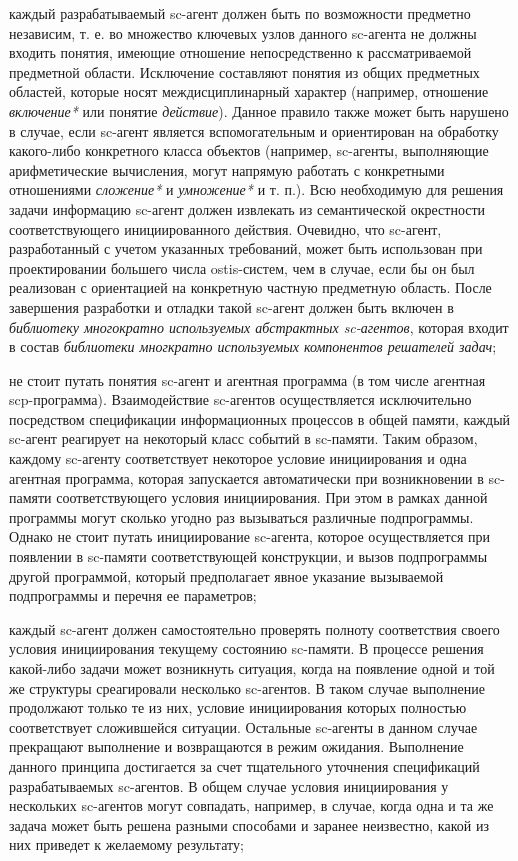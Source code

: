 \begin{textitemize}
\item каждый разрабатываемый sc-агент должен быть по возможности предметно независим, т. е. во множество ключевых узлов данного sc-агента не должны входить понятия, имеющие отношение непосредственно к рассматриваемой предметной области. Исключение составляют понятия из общих предметных областей, которые носят междисциплинарный характер (например, отношение \textit{включение*} или понятие \textit{действие}). Данное правило также может быть нарушено в случае, если sc-агент является вспомогательным и ориентирован на обработку какого-либо конкретного класса объектов (например, sc-агенты, выполняющие арифметические вычисления, могут напрямую работать с конкретными отношениями \textit{сложение*} и \textit{умножение*} и т. п.). Всю необходимую для решения задачи информацию sc-агент должен извлекать из семантической окрестности соответствующего инициированного действия. Очевидно, что sc-агент, разработанный с учетом указанных требований, может быть использован при проектировании большего числа ostis-систем, чем в случае, если бы он был реализован с ориентацией на конкретную частную предметную область. После завершения разработки и отладки такой sc-агент должен быть включен в \textit{библиотеку многократно используемых абстрактных sc-агентов}, которая входит в состав \textit{библиотеки многкратно используемых компонентов решателей задач};
\item не стоит путать понятия sc-агент и агентная программа (в том числе агентная scp-программа). Взаимодействие sc-агентов осуществляется исключительно посредством спецификации информационных процессов в общей памяти, каждый sc-агент реагирует на некоторый класс событий в sc-памяти. Таким образом, каждому sc-агенту соответствует некоторое условие инициирования и одна агентная программа, которая запускается автоматически при возникновении в sc-памяти соответствующего условия инициирования. При этом в рамках данной программы могут сколько угодно раз вызываться различные подпрограммы. Однако не стоит путать инициирование sc-агента, которое осуществляется при появлении в sc-памяти соответствующей конструкции, и вызов подпрограммы другой программой, который предполагает явное указание вызываемой подпрограммы и перечня ее параметров;
\item каждый sc-агент должен самостоятельно проверять полноту соответствия своего условия инициирования текущему состоянию sc-памяти. В процессе решения какой-либо задачи может возникнуть ситуация, когда на появление одной и той же структуры среагировали несколько sc-агентов. В таком случае выполнение продолжают только те из них, условие инициирования которых полностью соответствует сложившейся ситуации. Остальные sc-агенты в данном случае прекращают выполнение и возвращаются в режим ожидания. Выполнение данного принципа достигается за счет тщательного уточнения спецификаций разрабатываемых sc-агентов. В общем случае условия инициирования у нескольких sc-агентов могут совпадать, например, в случае, когда одна и та же задача может быть решена разными способами и заранее неизвестно, какой из них приведет к желаемому результату;

\end{textitemize}
